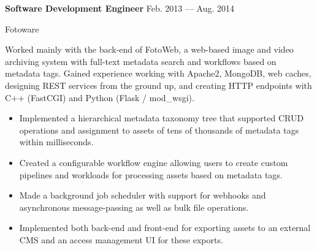\parbox[t][][t]{\linewidth}{
	{\hfill\parbox{\linewidth}{
		\parbox{\linewidth}{
			\textbf{Software Development Engineer}
			\hfill
			{Feb. 2013 --- Aug. 2014}
		}
	}}
	\smallskip
	\parbox{\linewidth}{Fotoware}

	\bigskip
	Worked mainly with the back-end of FotoWeb, a web-based image and video
	archiving system with full-text metadata search and workflows based on
	metadata tags. Gained experience working with Apache2, MongoDB, web
	caches, designing REST services from the ground up, and creating HTTP endpoints with C++ (FastCGI)
	and Python (Flask / mod\_wsgi).

	\bigskip
	\begin{itemize}
		\item{Implemented a hierarchical metadata taxonomy tree that
			supported CRUD operations and assignment to assets of tens of thousands of metadata tags within
			milliseconds.}\\[-.6em]
		\item{Created a configurable workflow engine allowing users to
			create custom pipelines and workloads for processing assets based on
			metadata tags.}\\[-.6em]
		\item{Made a background job scheduler with support for
			webhooks and asynchronous message-passing as well as
			bulk file operations.}\\[-.6em]
		\item{Implemented both back-end and front-end for exporting
			assets to an external CMS and an access 
			management UI for these exports.}\\[-.6em]
	\end{itemize}
}
